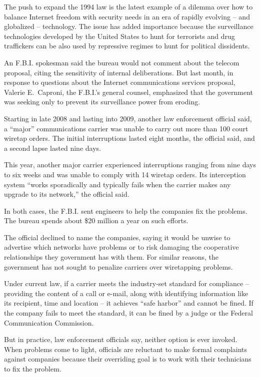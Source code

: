 ﻿\documentclass[12pt]{article}
\begin{document}
The push to expand the 1994 law is the latest example of a dilemma over how to balance Internet
freedom with security needs in an era of rapidly evolving -- and globalized -- technology. The issue
has added importance because the surveillance technologies developed by the United States to hunt
for terrorists and drug traffickers can be also used by repressive regimes to hunt for political
dissidents.

An F.B.I. spokesman said the bureau would not comment about the telecom proposal, citing the
sensitivity of internal deliberations. But last month, in response to questions about the Internet
communications services proposal, Valerie E.~Caproni, the F.B.I.'s general counsel, emphasized that
the government was seeking only to prevent its surveillance power from eroding.

Starting in late 2008 and lasting into 2009, another law enforcement official said, a ``major''
communications carrier was unable to carry out more than 100 court wiretap orders. The initial
interruptions lasted eight months, the official said, and a second lapse lasted nine days.

This year, another major carrier experienced interruptions ranging from nine days to six weeks and
was unable to comply with 14 wiretap orders. Its interception system ``works sporadically and
typically fails when the carrier makes any upgrade to its network,'' the official said.

In both cases, the F.B.I. sent engineers to help the companies fix the problems. The bureau spends
about \$20 million a year on such efforts.

The official declined to name the companies, saying it would be unwise to advertise which networks
have problems or to risk damaging the cooperative relationships they government has with them. For
similar reasons, the government has not sought to penalize carriers over wiretapping problems.

Under current law, if a carrier meets the industry-set standard for compliance -- providing the
content of a call or e-mail, along with identifying information like its recipient, time and
location -- it achieves ``safe harbor'' and cannot be fined. If the company fails to meet the
standard, it can be fined by a judge or the Federal Communication Commission.

But in practice, law enforcement officials say, neither option is ever invoked. When problems come
to light, officials are reluctant to make formal complaints against companies because their
overriding goal is to work with their technicians to fix the problem.
\end{document}
